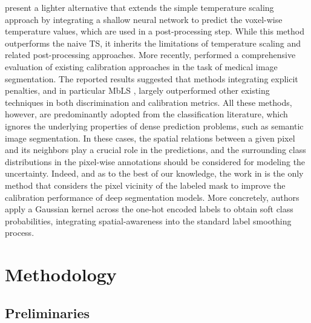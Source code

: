 \documentclass[twocolumn,final,10pt]{elsarticle}
\newcommand{\rev}[1]{{\color{black}#1}}
\begin{document}
\rev{\cite{ding2021local} present a lighter alternative that extends the simple temperature scaling approach by integrating a shallow neural network to predict the voxel-wise temperature values, which are used in a post-processing step. While this method %
outperforms the naive TS, it inherits the limitations of temperature scaling and related post-processing approaches. More recently, \citep{murugesan2022calibrating} performed a comprehensive evaluation of existing calibration approaches in the task of medical image segmentation. The reported results suggested that methods integrating explicit penalties, and in particular MbLS \citep{liu2022devil}, largely outperformed other existing techniques in both discrimination and calibration metrics. All these methods, however, are predominantly adopted from the classification literature, which ignores the underlying properties of dense prediction problems, such as semantic image segmentation. In these cases, the spatial relations between a given pixel and its neighbors play a crucial role in the predictions, and the surrounding class distributions in the pixel-wise annotations should be considered for modeling the uncertainty. %
Indeed, and as to the best of our knowledge, the work in \citep{islam2021spatially} is the only method that considers the pixel vicinity of the labeled mask to improve the calibration performance of deep segmentation models. More concretely, authors apply a Gaussian kernel across the one-hot encoded labels to obtain soft class probabilities, integrating spatial-awareness into the standard label smoothing process. }


\section{Methodology}


\subsection{Preliminaries}
\end{document}
